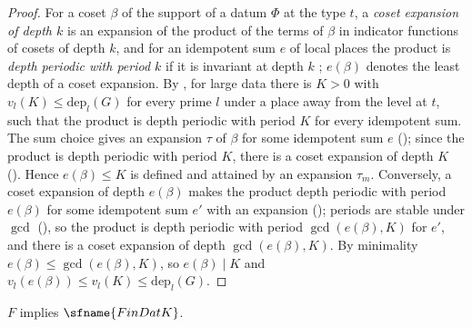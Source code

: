 \begin{proof}
For a coset $\beta$ of the support of a datum $\Phi$ at the type $t$, a \emph{coset expansion of depth $k$} is an expansion of
the product of the terms of $\beta$ in indicator functions of cosets of depth $k$, and for an idempotent sum $e$ of local
places the product is \emph{depth periodic with period $k$} if it is invariant at depth $k$ \cite{LeanSource2026}; $e(\beta)$
denotes the least depth of a coset expansion. By , for large
data there is $K>0$ with $v_l(K)\le\mathrm{dep}_l(G)$ for every prime $l$ under a place away from the level at $t$, such that the
product is depth periodic with period $K$ for every idempotent sum. The sum choice gives an expansion $\tau$ of $\beta$ for some
idempotent sum $e$ (); since the product is depth periodic with period $K$,
there is a coset expansion of depth $K$ (). Hence
$e(\beta)\le K$ is defined and attained by an expansion $\tau_m$. Conversely, a coset expansion of depth $e(\beta)$ makes the
product depth periodic with period $e(\beta)$ for some idempotent sum $e'$ with an expansion
(); periods are stable under $\gcd$
(), so the product is depth periodic with period $\gcd(e(\beta),K)$ for
$e'$, and there is a coset expansion of depth $\gcd(e(\beta),K)$. By minimality $e(\beta)\le\gcd(e(\beta),K)$, so
$e(\beta)\mid K$ and $v_l(e(\beta))\le v_l(K)\le\mathrm{dep}_l(G)$.
\end{proof}

\begin{theorem}\label{pf:fit:findat}
$F$ implies $\sfname{FinDatK}$.
\end{theorem}

